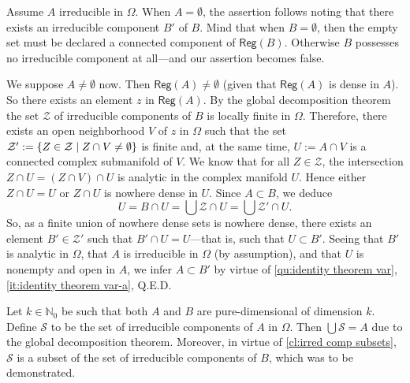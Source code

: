 \documentclass[a4paper]{amsart}
\newcommand{\N}{\mathbb{N}}
\newcommand{\Reg}[1]{\mathsf{Reg}(#1)}
\theoremstyle{remark}
\numberwithin{equation}{question}
\DeclarePairedDelimiter\set{\{}{\}}
\begin{document}
\begin{solution}
\begin{solenum}
\item Assume $A$ irreducible in $\Omega$. When $A = \emptyset$, the assertion follows noting that there exists an irreducible component $B'$ of $B$. Mind that when $B = \emptyset$, then the empty set must be declared a connected component of $\Reg B$. Otherwise $B$ possesses no irreducible component at all---and our assertion becomes false.

We suppose $A \ne \emptyset$ now. Then $\Reg A \ne \emptyset$ (given that $\Reg A$ is dense in $A$). So there exists an element $z$ in $\Reg A$. By the global decomposition theorem the set $\mathcal Z$ of irreducible components of $B$ is locally finite in $\Omega$. Therefore, there exists an open neighborhood $V$ of $z$ in $\Omega$ such that the set $\mathcal Z' := \set{Z \in \mathcal Z \mid Z \cap V \ne \emptyset}$ is finite and, at the same time, $U := A \cap V$ is a connected complex submanifold of $V$. We know that for all $Z \in \mathcal Z$, the intersection $Z \cap U = (Z \cap V) \cap U$ is analytic in the complex manifold $U$. Hence either $Z \cap U = U$ or $Z \cap U$ is nowhere dense in $U$.
Since $A \subset B$, we deduce
\[
U = B \cap U = \bigcup\mathcal Z \cap U = \bigcup\mathcal Z' \cap U.
\]
So, as a finite union of nowhere dense sets is nowhere dense, there exists an element $B' \in \mathcal Z'$ such that $B' \cap U = U$---that is, such that $U \subset B'$. Seeing that $B'$ is analytic in $\Omega$, that $A$ is irreducible in $\Omega$ (by assumption), and that $U$ is nonempty and open in $A$, we infer $A \subset B'$ by virtue of \cref{qu:identity theorem var}, \cref{it:identity theorem var-a}, Q.E.D.

\item Let $k \in \N_0$ be such that both $A$ and $B$ are pure-dimensional of dimension $k$.
Define $\mathcal S$ to be the set of irreducible components of $A$ in $\Omega$. Then $\bigcup\mathcal S = A$ due to the global decomposition theorem. Moreover, in virtue of \cref{cl:irred comp subsets}, $\mathcal S$ is a subset of the set of irreducible components of $B$, which was to be demonstrated.


\end{solenum}
\end{solution}
\end{document}

